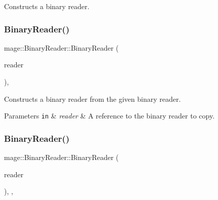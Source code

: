 Constructs a binary reader. \hypertarget{classmage_1_1_binary_reader_a8c1ff948f1d056439f3d8cc37d7f507c}{}\label{classmage_1_1_binary_reader_a8c1ff948f1d056439f3d8cc37d7f507c} 
\subsubsection{\texorpdfstring{Binary\+Reader()}{BinaryReader()}\hspace{0.1cm}{\footnotesize\ttfamily [2/3]}}
{\footnotesize\ttfamily mage\+::\+Binary\+Reader\+::\+Binary\+Reader (\begin{DoxyParamCaption}\item[{const \hyperlink{classmage_1_1_binary_reader}{Binary\+Reader} \&}]{reader }\end{DoxyParamCaption})\hspace{0.3cm}{\ttfamily [protected]}, {\ttfamily [delete]}}

Constructs a binary reader from the given binary reader.


\begin{DoxyParams}[1]{Parameters}
\mbox{\tt in}  & {\em reader} & A reference to the binary reader to copy. \\
\hline
\end{DoxyParams}
\hypertarget{classmage_1_1_binary_reader_a520841747b74b4b0e95f8d9b595492fa}{}\label{classmage_1_1_binary_reader_a520841747b74b4b0e95f8d9b595492fa} 
\subsubsection{\texorpdfstring{Binary\+Reader()}{BinaryReader()}\hspace{0.1cm}{\footnotesize\ttfamily [3/3]}}
{\footnotesize\ttfamily mage\+::\+Binary\+Reader\+::\+Binary\+Reader (\begin{DoxyParamCaption}\item[{\hyperlink{classmage_1_1_binary_reader}{Binary\+Reader} \&\&}]{reader }\end{DoxyParamCaption})\hspace{0.3cm}{\ttfamily [protected]}, {\ttfamily [default]}, {\ttfamily [noexcept]}}


